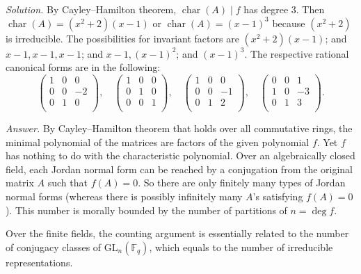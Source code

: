 \documentclass{mathproblems}
\newcommand\F{\mathbb{F}}
\newcommand\GL{\mathrm{GL}}
\begin{document}
\begin{questions}
\textit{Solution.} By Cayley--Hamilton theorem, $\operatorname{char}(A)\mid f$ has degree 3. Then $\operatorname{char}(A)=(x^2+2)(x-1)$ or $\operatorname{char}(A)=(x - 1)^3$ because $(x^2+2)$ is irreducible. The possibilities for invariant factors are $(x^2+2)(x-1)$; and $x-1,x-1,x-1$; and $x-1,(x-1)^2$; and $(x-1)^3$. The respective rational canonical forms are in the following:
$$
\begin{pmatrix}
    1 & 0 & 0\\
    0 & 0 & -2\\
    0 & 1 & 0\\
\end{pmatrix}, \quad
\begin{pmatrix}
    1 & 0 & 0\\
    0 & 1 & 0\\
    0 & 0 & 1\\
\end{pmatrix}, \quad
\begin{pmatrix}
    1 & 0 & 0\\
    0 & 0 & -1\\
    0 & 1 & 2\\
\end{pmatrix}, \quad
\begin{pmatrix}
    0 & 0 & 1\\
    1 & 0 & -3\\
    0 & 1 & 3\\
\end{pmatrix}.
$$


\textit{Answer.} By Cayley--Hamilton theorem that holds over all commutative rings, the minimal polynomial of the matrices are factors of the given polynomial $f$. Yet $f$ has nothing to do with the characteristic polynomial. Over an algebraically closed field, each Jordan normal form can be reached by a conjugation from the original matrix $A$ such that $f(A)=0$. So there are only finitely many types of Jordan normal forms (whereas there is possibly infinitely many $A$'s satisfying $f(A)=0$). This number is morally bounded by the number of partitions of $n=\deg f$.

Over the finite fields, the counting argument is essentially related to the number of conjugacy classes of $\GL_n(\F_q)$, which equals to the number of irreducible representations. 



\end{questions}
\end{document}
